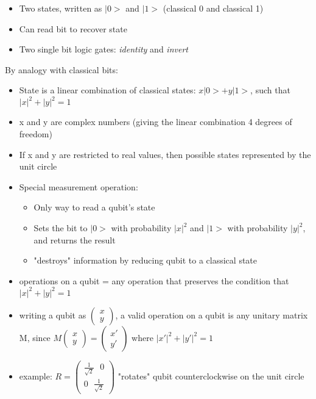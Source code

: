 \begin{itemize}
    \item Two states, written as $|0>$ and $|1>$ (classical 0 and classical 1)
    \item Can read bit to recover state
    \item Two single bit logic gates: \emph{identity} and \emph{invert}
\end{itemize}
By analogy with classical bits:
\begin{itemize}
    \item State is a linear combination of classical states: $x|0> + y|1>$, such that $|x|^2 + |y|^2 = 1$
    \item x and y are complex numbers (giving the linear combination 4 degrees of freedom)
    \item If x and y are restricted to real values, then possible states represented by the unit circle
    \item Special measurement operation: 
    	\begin{itemize}
		\item Only way to read a qubit's state
		\item Sets the bit to $|0>$ with probability $|x|^2$ and $|1>$ with probability $|y|^2$, and returns the result
		\item "destroys" information by reducing qubit to a classical state
	\end{itemize}
    \item operations on a qubit = any operation that preserves the condition that $|x|^2 + |y|^2 = 1$
    \item writing a qubit as $\begin{pmatrix} x \\ y \end{pmatrix}$, a valid operation on a qubit is any unitary matrix M, since $M\begin{pmatrix} x \\ y \end{pmatrix} = \begin{pmatrix} x' \\ y' \end{pmatrix}$ where $|x'|^2 + |y'|^2 = 1$
    \item example: $R =  \begin{pmatrix} \frac{1}{\sqrt{2}} \ \ \ 0 \\ 0 \ \ \ \frac{1}{\sqrt{2}} \end{pmatrix}$ "rotates" qubit counterclockwise on the unit circle
\end{itemize}

